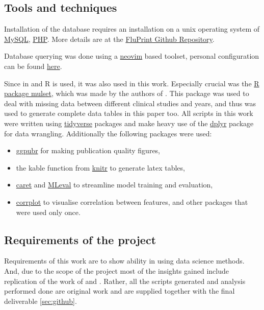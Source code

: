 \subsection{Tools and techniques}

Installation of the \flup database requires an installation on a unix operating system of \href{https://www.mysql.com/}{MySQL}, \href{https://www.php.net/manual/en/install.php}{PHP}. More details are at the \href{https://github.com/LogIN-/fluprint}{FluPrint Github Repository}.

Database querying was done using a \href{https://neovim.io/}{neovim} based toolset, personal configuration can be found
\href{https://github.com/Vinkage/mike_neovim/tree/feature}{here}.

Since in \dpaper and \spaper R is used, it was also used in this work.
Especially crucial was the \href{https://cran.r-project.org/web/packages/mulset/index.html}{R package mulset}, which was made by the authors of \spaper.
This package was used to deal with missing data between different clinical studies and years, and thus was used to generate complete data tables in this paper too.
All scripts in this work were written using \href{https://www.tidyverse.org/}{tidyverse} packages and make heavy use of the \href{https://dplyr.tidyverse.org/}{dplyr} package for data wrangling.
Additionally the following packages were used:
\begin{itemize}
    \item \href{https://cran.r-project.org/web/packages/ggpubr/index.html}{ggpubr} for making publication quality figures,
    \item the kable function from \href{https://www.r-project.org/nosvn/pandoc/knitr.html}{knitr} to generate latex tables,
    \item \href{https://topepo.github.io/caret/}{caret} and \href{https://cran.r-project.org/web/packages/MLeval/index.html}{MLeval} to streamline model training and evaluation,
    \item \href{https://cran.r-project.org/web/packages/corrplot/vignettes/corrplot-intro.html}{corrplot} to visualise correlation between features, and other packages that were used only once.
\end{itemize}

\subsection{Requirements of the project}

Requirements of this work are to show ability in using data science methods.
And, due to the scope of the project most of the insights gained include replication of the work of \dpaper and \spaper.
Rather, all the scripts generated and analysis performed done are original work and are supplied together with the final deliverable \autoref{sec:github}.


